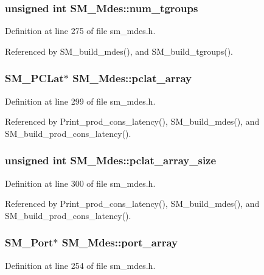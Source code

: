\subsubsection{\setlength{\rightskip}{0pt plus 5cm}unsigned int \bf{SM\_\-Mdes::num\_\-tgroups}}\label{structSM__Mdes_78aa6465b68f4de612344116e9e3d4b5}




Definition at line 275 of file sm\_\-mdes.h.

Referenced by SM\_\-build\_\-mdes(), and SM\_\-build\_\-tgroups().
\subsubsection{\setlength{\rightskip}{0pt plus 5cm}\bf{SM\_\-PCLat}$\ast$ \bf{SM\_\-Mdes::pclat\_\-array}}\label{structSM__Mdes_1d910e561a438cee14edfd128d9a5ff4}




Definition at line 299 of file sm\_\-mdes.h.

Referenced by Print\_\-prod\_\-cons\_\-latency(), SM\_\-build\_\-mdes(), and SM\_\-build\_\-prod\_\-cons\_\-latency().
\subsubsection{\setlength{\rightskip}{0pt plus 5cm}unsigned int \bf{SM\_\-Mdes::pclat\_\-array\_\-size}}\label{structSM__Mdes_0ef2fe454d0828aba573b379067fe77d}




Definition at line 300 of file sm\_\-mdes.h.

Referenced by Print\_\-prod\_\-cons\_\-latency(), SM\_\-build\_\-mdes(), and SM\_\-build\_\-prod\_\-cons\_\-latency().
\subsubsection{\setlength{\rightskip}{0pt plus 5cm}\bf{SM\_\-Port}$\ast$ \bf{SM\_\-Mdes::port\_\-array}}\label{structSM__Mdes_492861f2ef57a43b7324af4e5381d605}




Definition at line 254 of file sm\_\-mdes.h.


